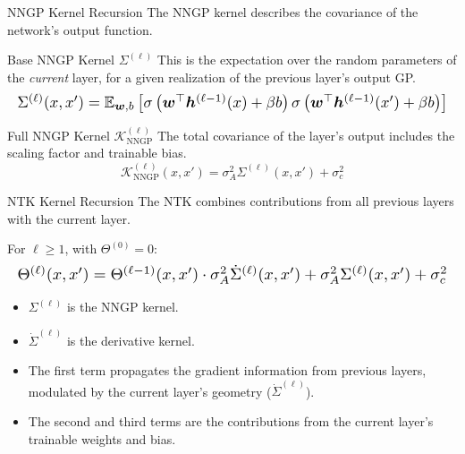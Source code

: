 \documentclass{beamer}
\begin{document}
\begin{frame}{NNGP Kernel Recursion}
The NNGP kernel describes the covariance of the network's output function.
\begin{block}{Base NNGP Kernel $\Sigma^{(\ell)}$}
This is the expectation over the random parameters of the \textit{current} layer, for a given realization of the previous layer's output GP.
\begin{equation*}
\resizebox{\hsize}{!}{$
\Sigma^{(\ell)}(x, x') = \mathbb{E}_{\bm{w}, b} \left[ \sigma\left(\bm{w}^\top \bm{h}^{(\ell-1)}(x) + \beta b\right) \sigma\left(\bm{w}^\top \bm{h}^{(\ell-1)}(x') + \beta b\right) \right]
$}
\end{equation*}
\end{block}
\begin{block}{Full NNGP Kernel $\mathcal{K}_{\text{NNGP}}^{(\ell)}$}
The total covariance of the layer's output includes the scaling factor and trainable bias.
\begin{equation*}
    \mathcal{K}_{\text{NNGP}}^{(\ell)}(x, x') = \sigma_A^2 \Sigma^{(\ell)}(x, x') + \sigma_c^2
\end{equation*}
\end{block}
\end{frame}

\begin{frame}{NTK Kernel Recursion}
The NTK combines contributions from all previous layers with the current layer.
\begin{theorem}
For $\ell \ge 1$, with $\Theta^{(0)}=0$:
\begin{equation*}
\resizebox{\hsize}{!}{$
\Theta^{(\ell)}(x, x') = \Theta^{(\ell-1)}(x, x') \cdot \sigma_A^2\dot{\Sigma}^{(\ell)}(x, x') + \sigma_A^2 \Sigma^{(\ell)}(x, x') + \sigma_c^2
$}
\end{equation*}
\end{theorem}
\begin{itemize}
    \item $\Sigma^{(\ell)}$ is the NNGP kernel.
    \item $\dot{\Sigma}^{(\ell)}$ is the derivative kernel.
    \item The first term propagates the gradient information from previous layers, modulated by the current layer's geometry ($\dot{\Sigma}^{(\ell)}$).
    \item The second and third terms are the contributions from the current layer's trainable weights and bias.
\end{itemize}
\end{frame}
\end{document}
